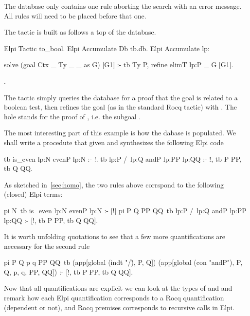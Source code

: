 \documentclass[a4paper, 11pt]{book}
\begin{document}
The database only contains one rule aborting the search with an error message.
All rules will need to be placed before that one.

The  tactic is built as follows a top of the
database.

\begin{rocqcode}
Elpi Tactic to_bool.
Elpi Accumulate Db tb.db.
Elpi Accumulate lp:{{

solve (goal Ctx _ Ty _ _ as G) [G1] :-
  tb Ty P,
  refine {{ elimT lp:P _ }} G [G1].

}}.
\end{rocqcode}

The tactic simply queries the database for a proof  that
the goal is related to a boolean test, then refines the goal (as in the
standard Rocq  tactic) with .
The hole stands for the proof of , i.e. the subgoal
.

The most interesting part of this example is how the dabase is populated.
We shall write a  procedute that given 
and  synthesizes the following Elpi code

\begin{elpicode}
tb {{ is_even lp:N }} {{ evenP lp:N }} :- !.
tb {{ lp:P /\ lp:Q }} {{ andP lp:PP lp:QQ }} :- !, tb P PP, tb Q QQ.
\end{elpicode}

As sketched in~\cref{sec:homo}, the two rules above corrspond to the
following (closed) Elpi terms:

\begin{elpicode}
pi N\ tb {{ is_even lp:N }} {{ evenP lp:N }} :- [!]
pi P Q PP QQ\ tb {{ lp:P /\ lp:Q }} {{ andP lp:PP lp:QQ }} :-
  [!, tb P PP, tb Q QQ].
\end{elpicode}

It is worth unfolding quotations to see that a few more quantifications are
necessary for the second rule

\begin{elpicode}
pi P Q p q PP QQ\
  tb (app[global (indt "/\"), P, Q])
     (app[global (con "andP"), P, Q, p, q, PP, QQ]) :-
  [!, tb P PP, tb Q QQ].
\end{elpicode}
  

Now that all quantifications are explicit we can look at the types of
\rocq{evenP} and \rocq{andP} and remark how each \elpi{pi}
Elpi quantification corresponds to a Rocq quantification (dependent or not),
and Rocq premises corresponds to recursive calls in Elpi.
\end{document}

